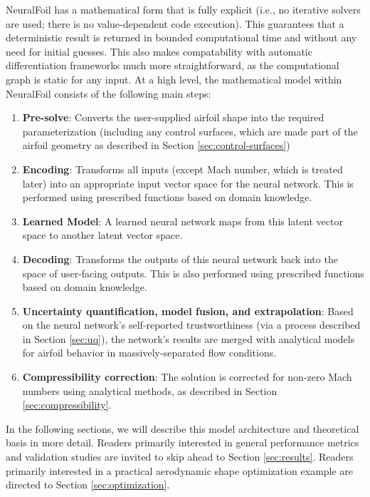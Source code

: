 \documentclass[journal]{new-aiaa}
\begin{document}
\noindent NeuralFoil has a mathematical form that is fully explicit (i.e., no iterative solvers are used; there is no value-dependent code execution). This guarantees that a deterministic result is returned in bounded computational time and without any need for initial guesses. This also makes compatability with automatic differentiation frameworks much more straightforward, as the computational graph is static for any input. At a high level, the mathematical model within NeuralFoil consists of the following main steps:

\begin{enumerate}
    \item \textbf{Pre-solve}: Converts the user-supplied airfoil shape into the required parameterization (including any control surfaces, which are made part of the airfoil geometry as described in Section \ref{sec:control-surfaces})
    \item \textbf{Encoding}: Transforms all inputs (except Mach number, which is treated later) into an appropriate input vector space for the neural network. This is performed using prescribed functions based on domain knowledge.
    \item \textbf{Learned Model}: A learned neural network maps from this latent vector space to another latent vector space.
    \item \textbf{Decoding}: Transforms the outputs of this neural network back into the space of user-facing outputs. This is also performed using prescribed functions based on domain knowledge.
    \item \textbf{Uncertainty quantification, model fusion, and extrapolation}: Based on the neural network's self-reported trustworthiness (via a process described in Section \ref{sec:uq}), the network's results are merged with analytical models for airfoil behavior in massively-separated flow conditions.
    \item \textbf{Compressibility correction}: The solution is corrected for non-zero Mach numbers using analytical methods, as described in Section \ref{sec:compressibility}.
\end{enumerate}

\noindent In the following sections, we will describe this model architecture and theoretical basis in more detail. Readers primarily interested in general performance metrics and validation studies are invited to skip ahead to Section \ref{sec:results}. Readers primarily interested in a practical aerodynamic shape optimization example are directed to Section \ref{sec:optimization}.
\end{document}

